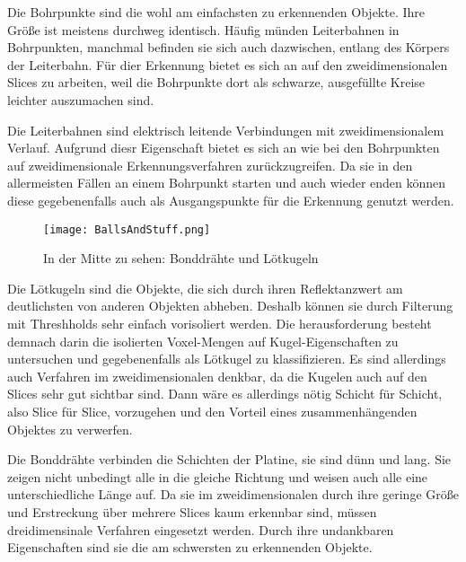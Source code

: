 
Die Bohrpunkte sind die wohl am einfachsten zu erkennenden Objekte. Ihre Größe ist meistens durchweg identisch. Häufig münden Leiterbahnen in Bohrpunkten, manchmal befinden sie sich auch dazwischen, entlang des Körpers der Leiterbahn. Für dier Erkennung bietet es sich an auf den zweidimensionalen Slices zu arbeiten, weil die Bohrpunkte dort als schwarze, ausgefüllte Kreise leichter auszumachen sind.

Die Leiterbahnen sind elektrisch leitende Verbindungen mit zweidimensionalem Verlauf. Aufgrund diesr Eigenschaft bietet es sich an wie bei den Bohrpunkten auf zweidimensionale Erkennungsverfahren zurückzugreifen. Da sie in den allermeisten Fällen an einem Bohrpunkt starten und auch wieder enden können diese gegebenenfalls auch als Ausgangspunkte für die Erkennung genutzt werden.

\begin{figure}[H]
  \begin{center}
    \texttt{[image: BallsAndStuff.png]}
    \caption{In der Mitte zu sehen: Bonddrähte und Lötkugeln}
    \label{fig:BallsAndBonds}
  \end{center}
\end{figure}

Die Lötkugeln sind die Objekte, die sich durch ihren Reflektanzwert am deutlichsten von anderen Objekten abheben. Deshalb können sie durch Filterung mit Threshholds sehr einfach vorisoliert werden. Die herausforderung besteht demnach darin die isolierten Voxel-Mengen auf Kugel-Eigenschaften zu untersuchen und gegebenenfalls als Lötkugel zu klassifizieren. Es sind allerdings auch Verfahren im zweidimensionalen denkbar, da die Kugelen auch auf den Slices sehr gut sichtbar sind. Dann wäre es allerdings nötig Schicht für Schicht, also Slice für Slice, vorzugehen und den Vorteil eines zusammenhängenden Objektes zu verwerfen.

Die Bonddrähte verbinden die Schichten der Platine, sie sind dünn und lang. Sie zeigen nicht unbedingt alle in die gleiche Richtung und weisen auch alle eine unterschiedliche Länge auf. Da sie im zweidimensionalen durch ihre geringe Größe und Erstreckung über mehrere Slices kaum erkennbar sind, müssen dreidimensinale Verfahren eingesetzt werden. Durch ihre undankbaren Eigenschaften sind sie die am schwersten zu erkennenden Objekte.